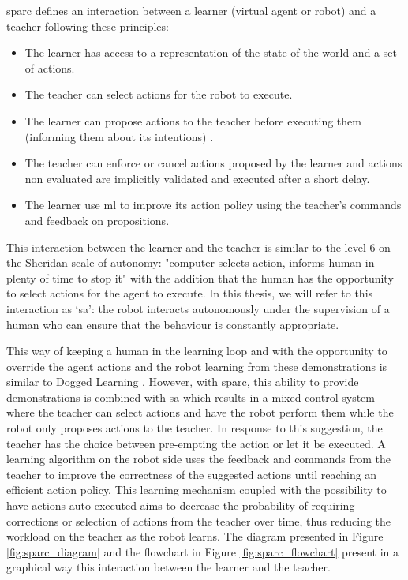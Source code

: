 \gls{sparc} defines an interaction between a learner (virtual agent or robot) and a teacher following these principles:
\begin{itemize}
	\item The learner has access to a representation of the state of the world and a set of actions.
	\item The teacher can select actions for the robot to execute.
	\item The learner can propose actions to the teacher before executing them (informing them about its intentions) .
	\item The teacher can enforce or cancel actions proposed by the learner and actions non evaluated are implicitly validated and executed after a short delay.
	\item The learner use \gls{ml} to improve its action policy using the teacher's commands and feedback on propositions.
\end{itemize} 

This interaction between the learner and the teacher is similar to the level 6 on the Sheridan scale of autonomy: "computer selects action, informs human in plenty of time to stop it" \citep{sheridan1978human} with the addition that the human has the opportunity to select actions for the agent to execute. In this thesis, we will refer to this interaction as `\gls{sa}': the robot interacts autonomously under the supervision of a human who can ensure that the behaviour is constantly appropriate.

This way of keeping a human in the learning loop and with the opportunity to override the agent actions and the robot learning from these demonstrations is similar to Dogged Learning \citep{grollman2007dogged}. However, with \gls{sparc}, this ability to provide demonstrations is combined with \gls{sa} which results in a mixed control system where the teacher can select actions and have the robot perform them while the robot only proposes actions to the teacher. In response to this suggestion, the teacher has the choice between pre-empting the action or let it be executed. A learning algorithm on the robot side uses the feedback and commands from the teacher to improve the correctness of the suggested actions until reaching an efficient action policy. This learning mechanism coupled with the possibility to have actions auto-executed aims to decrease the probability of requiring corrections or selection of actions from the teacher over time, thus reducing the workload on the teacher as the robot learns. The diagram presented in Figure \ref{fig:sparc_diagram} and the flowchart in Figure \ref{fig:sparc_flowchart} present in a graphical way this interaction between the learner and the teacher.

